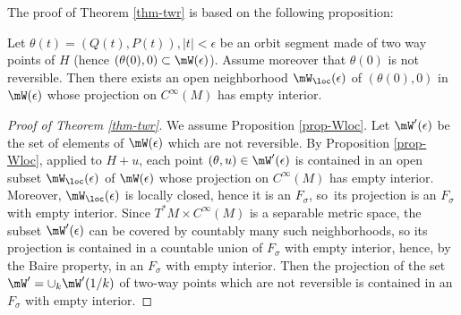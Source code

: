 The proof of Theorem \ref{thm-twr} is based on the following proposition:

\begin{prop}\label{prop-Wloc}
Let $\theta(t) =(Q(t),P(t)), |t|<\epsilon $ be an orbit segment made of two way points of $H$ (hence $(\theta(0),0)\subset \mW(\epsilon)$).
Assume moreover that $\theta(0)$ is not reversible.
Then there exists an open neighborhood $\mW_{\loc}(\epsilon)$ of
$(\theta(0),0)$ in $\mW(\epsilon)$ whose projection on
$C^{\infty}(M)$ has empty interior.
\end{prop}

\begin{proof}[Proof of Theorem \ref{thm-twr}]
We assume Proposition \ref{prop-Wloc}.
Let $\mW'(\epsilon)$ be the set of elements of $\mW(\epsilon)$ which are not reversible.
By Proposition \ref{prop-Wloc}, applied to $H+u$,
each point $(\theta,u)\in \mW'(\epsilon)$ is contained in an open subset $\mW_{\loc}(\epsilon)$ of $\mW(\epsilon)$ whose projection on $C^{\infty}(M)$ has empty interior. Moreover, $\mW_{\loc}(\epsilon)$ is locally closed, hence it is an $F_{\sigma}$, so~its projection
is an $F_{\sigma}$ with empty interior.
Since $T^*M\times C^{\infty}(M)$ is a separable metric space, the subset $ \mW'(\epsilon)$ can be covered by countably many
such neighborhoods, so its projection is contained in a countable union of $F_{\sigma}$ with empty interior, hence, by the Baire property, in an $F_{\sigma}$ with empty interior.
Then the projection of the set $\mW'=\cup _{k}\mW'(1/k)$ of two-way points which are not reversible is contained in an $F_{\sigma}$ with empty interior.
\end{proof}


